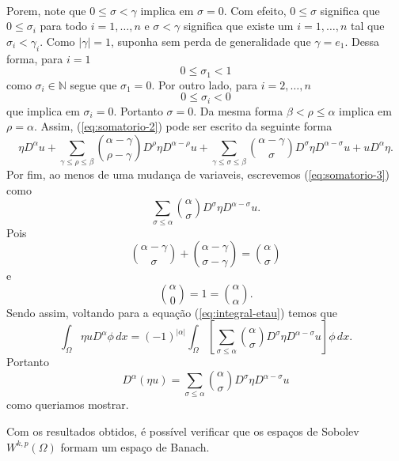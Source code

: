 \documentclass[a4paper, 11pt]{book}
\theoremstyle{definition}
\newcommand{\bN}{\mathbb{N}}
\begin{document}
\begin{prf}
\begin{equation}
\begin{aligned}
           \end{aligned}
    \end{equation}
    Porem, note que $0 \leqslant \sigma < \gamma$ implica em $\sigma = 0$. Com efeito, $0 \leqslant \sigma$ significa que $0 \leqslant \sigma_i$ para todo $i = 1,\dots,n$ e $\sigma < \gamma$ significa que existe um $i = 1,\dots,n$ tal que $\sigma_i < \gamma_i$. Como $|\gamma| = 1$, suponha sem perda de generalidade que $\gamma = e_1$.
    Dessa forma, para $i = 1$
    \[
        0 \leqslant \sigma_1 < 1
    \]
    como $\sigma_i \in \bN$ segue que $\sigma_1 = 0$. Por outro lado, para $i = 2,\dots,n$
    \[
        0 \leqslant \sigma_i < 0
    \]
    que implica em $\sigma_i = 0$. Portanto $\sigma = 0$.
    Da mesma forma $\beta < \rho \leqslant \alpha$ implica em $\rho =\alpha$.
    Assim, (\ref{eq:somatorio-2}) pode ser escrito da seguinte forma
    \begin{equation} \label{eq:somatorio-3}
        \eta D^{\alpha} u + \sum_{\gamma \leqslant \rho \leqslant \beta} \binom{\alpha - \gamma}{\rho - \gamma} D^{\rho}\eta D^{\alpha - \rho} u + \sum_{\gamma \leqslant \sigma \leqslant \beta} \binom{\alpha - \gamma}{\sigma} D^{\sigma} \eta D^{\alpha - \sigma} u + 
        u D^{\alpha}\eta.
    \end{equation}
    Por fim, ao menos de uma mudança de variaveis, escrevemos (\ref{eq:somatorio-3}) como
    \[
        \sum_{\sigma \leqslant \alpha} \binom{\alpha}{\sigma} D^{\sigma} \eta D^{\alpha - \sigma} u.
    \]
    Pois
    \[
        \binom{\alpha - \gamma}{\sigma} + \binom{\alpha - \gamma}{\sigma - \gamma} = \binom{\alpha}{\sigma}
    \]
    e
    \[
        \binom{\alpha}{0} = 1 = \binom{\alpha}{\alpha}.
    \]
    Sendo assim, voltando para a equação (\ref{eq:integral-etau}) temos que
    \[
        \int_\Omega \eta u D^{\alpha}\phi \, dx = (-1)^{|\alpha|} \int_\Omega \left[\sum_{\sigma \leqslant \alpha} \binom{\alpha}{\sigma} D^{\sigma} \eta D^{\alpha - \sigma} u\right] \phi \,dx.
    \]
    Portanto
    \[
        D^\alpha (\eta u) = \sum_{\sigma \leqslant \alpha} \binom{\alpha}{\sigma} D^{\sigma} \eta D^{\alpha - \sigma} u
    \]
    como queriamos mostrar.
\end{prf}

Com os resultados obtidos, é possível verificar que os espaços de Sobolev $W^{k,p}(\Omega)$ formam um espaço de Banach.
\end{document}
